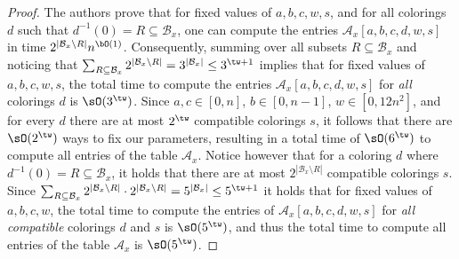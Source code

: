 \begin{proof}
    The authors prove that for fixed values of $a,b,c,w,s$,
    and for all colorings $d$ such that $d^{-1}(0) = R \subseteq \mathcal{B}_x$,
    one can compute the entries $\mathcal{A}_x [a,b,c,d,w,s]$ in time $2^{|\mathcal{B}_x \setminus R|} n^{\bO(1)}$.
    Consequently, summing over all subsets $R \subseteq \mathcal{B}_x$ and noticing that
    $\sum_{R \subseteq \mathcal{B}_x} 2^{|\mathcal{B}_x \setminus R|} = 3^{|\mathcal{B}_x|} \le 3^{\tw+1}$
    implies that for fixed values of $a,b,c,w,s$, the total time to compute the entries
    $\mathcal{A}_x [a,b,c,d,w,s]$ for \emph{all} colorings $d$ is $\sO(3^{\tw})$.
    Since $a,c \in [0,n]$, $b \in [0,n-1]$, $w \in [0,12n^2]$, and for every $d$ there are at most $2^{\tw}$
    compatible colorings $s$, it follows that there are $\sO(2^{\tw})$ ways to fix our parameters,
    resulting in a total time of $\sO(6^{\tw})$ to compute all entries of the table $\mathcal{A}_x$.
    Notice however that for a coloring $d$ where $d^{-1}(0) = R \subseteq \mathcal{B}_x$,
    it holds that there are at most $2^{|\mathcal{B}_x \setminus R|}$ compatible colorings $s$.
    Since $\sum_{R \subseteq \mathcal{B}_x} 2^{|\mathcal{B}_x \setminus R|} \cdot 2^{|\mathcal{B}_x \setminus R|} =
    5^{|\mathcal{B}_x|} \le 5^{\tw+1}$
    it holds that for fixed values of $a,b,c,w$,
    the total time to compute the entries of $\mathcal{A}_x [a,b,c,d,w,s]$
    for \emph{all compatible} colorings $d$ and $s$ is $\sO(5^{\tw})$,
    and thus the total time to compute all entries of the table $\mathcal{A}_x$ is $\sO(5^{\tw})$.
\end{proof}




